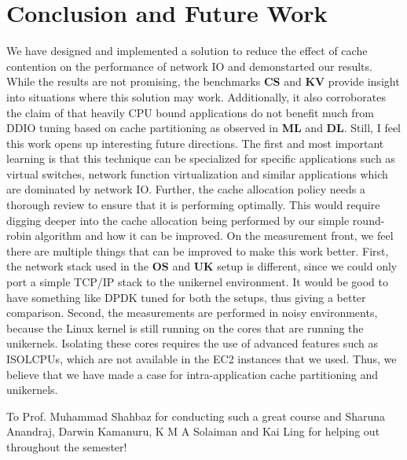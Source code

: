 \documentclass[sigconf,authorversion,noacm]{acmart}
\begin{document}
\section{Conclusion and Future Work}

We have designed and implemented a solution to reduce the effect of cache
contention on the performance of network IO and demonstarted our results. While
the results are not promising, the benchmarks \textbf{CS} and \textbf{KV}
provide insight into situations where this solution may work. Additionally, it
also corroborates the claim of \cite{alireza_2020} that heavily CPU bound
applications do not benefit much from DDIO tuning based on cache partitioning as
observed in \textbf{ML} and \textbf{DL}. Still, I feel this work opens up
interesting future directions. The first and most important learning is that
this technique can be specialized for specific applications such as virtual
switches, network function virtualization and similar applications which are
dominated by network IO. Further, the cache allocation policy needs a thorough
review to ensure that it is performing optimally. This would require digging
deeper into the cache allocation being performed by our simple round-robin
algorithm and how it can be improved. On the measurement front, we feel there
are multiple things that can be improved to make this work better. First, the
network stack used in the \textbf{OS} and \textbf{UK} setup is different, since
we could only port a simple TCP/IP stack to the unikernel environment. It would
be good to have something like DPDK tuned for both the setups, thus giving a
better comparison. Second, the measurements are performed in noisy environments,
because the Linux kernel is still running on the cores that are running the
unikernels. Isolating these cores requires the use of advanced features such as
ISOLCPUs, which are not available in the EC2 instances that we used. Thus, we
believe that we have made a case for intra-application cache partitioning and
unikernels.

\begin{acks}
    To Prof. Muhammad Shahbaz for conducting such a great course and Sharuna
    Anandraj, Darwin Kamanuru, K M A Solaiman and Kai Ling for helping out
    throughout the semester!
\end{acks}





\appendix
\end{document}
